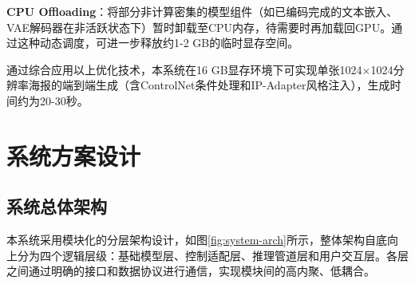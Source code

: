 \documentclass[12pt,a4paper]{ctexart}
\begin{document}
\textbf{CPU Offloading}：将部分非计算密集的模型组件（如已编码完成的文本嵌入、VAE解码器在非活跃状态下）暂时卸载至CPU内存，待需要时再加载回GPU。通过这种动态调度，可进一步释放约1-2 GB的临时显存空间。

通过综合应用以上优化技术，本系统在16 GB显存环境下可实现单张1024$\times$1024分辨率海报的端到端生成（含ControlNet条件处理和IP-Adapter风格注入），生成时间约为20-30秒。

\section{系统方案设计}

\subsection{系统总体架构}

本系统采用模块化的分层架构设计，如图\ref{fig:system-arch}所示，整体架构自底向上分为四个逻辑层级：基础模型层、控制适配层、推理管道层和用户交互层。各层之间通过明确的接口和数据协议进行通信，实现模块间的高内聚、低耦合。
\end{document}
